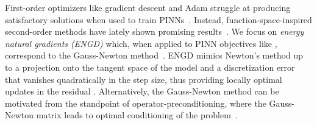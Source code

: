 First-order optimizers like gradient descent and Adam struggle at producing satisfactory solutions when used to train PINNs~\citep{cuomo2022scientific}.
Instead, function-space-inspired second-order methods have lately shown promising results~\citep{muller2024optimization}.
We focus on \emph{energy natural gradients (ENGD)} which, when applied to PINN objectives like , correspond to the Gauss-Newton method~\citep{muller2023achieving}.
ENGD mimics Newton's method up to a projection onto the tangent space of the model and a discretization error that vanishes quadratically in the step size, thus providing locally optimal updates in the residual%
. Alternatively, the Gauss-Newton method can be motivated from the standpoint of operator-preconditioning, where the Gauss-Newton matrix leads to optimal conditioning of the problem~\citep{de2023operator}.

